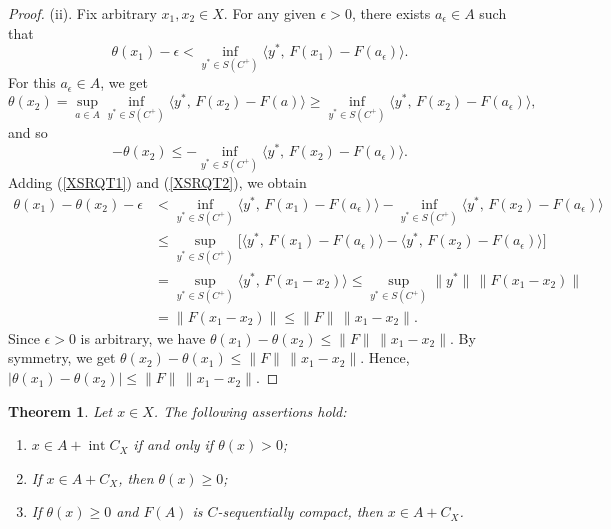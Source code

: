 \documentclass[11pt]{article}
\newtheorem{theorem}{Theorem}[section]
\begin{document}
\begin{proof}
	(ii). Fix arbitrary $x_1,x_2\in X$. For any given $\epsilon>0$, there exists $a_\epsilon\in A$ such that
	\begin{equation}   \label{XSRQT1}
		\theta(x_1)-\epsilon < \inf_{y^*\in S(C^+)}\langle y^*,\,F(x_1)-F(a_\epsilon)\rangle .  
	\end{equation}
	For this $a_\epsilon\in A$, we get 
$$
		\theta(x_2)=\sup_{a\in A}\inf_{y^*\in S(C^+)}\langle y^*,\,F(x_2)-F(a)\rangle
		\ge \inf_{y^*\in S(C^+)}\langle y^*,\,F(x_2)-F(a_\epsilon)\rangle , 
$$
 and so
	\begin{equation}\label{XSRQT2}
		-\theta(x_2)\le -\inf_{y^*\in S(C^+)}\langle y^*,\,F(x_2)-F(a_\epsilon)\rangle .  
	\end{equation}
	Adding  (\ref{XSRQT1})  and  (\ref{XSRQT2}), we obtain
	\begin{align*}
		\theta(x_1)-\theta(x_2)-\epsilon 
		&< \inf_{y^*\in S(C^+)}\langle y^*,\,F(x_1)-F(a_\epsilon)\rangle
		-\inf_{y^*\in S(C^+)}\langle y^*,\,F(x_2)-F(a_\epsilon)\rangle \\
		&\le \sup_{y^*\in S(C^+)}\Big[
		\langle y^*,\,F(x_1)-F(a_\epsilon)\rangle
		-\langle y^*,\,F(x_2)-F(a_\epsilon)\rangle
		\Big] \\
		&= \sup_{y^*\in S(C^+)} \langle y^*,\,F(x_1-x_2)\rangle  
		\le \sup_{y^*\in S(C^+)} \|y^*\|\,\|F(x_1-x_2)\| \\
		&= \|F(x_1-x_2)\| \le \|F\|\,\|x_1-x_2\|.
	\end{align*}
	Since $\epsilon>0$ is arbitrary, we have
$	\theta(x_1)-\theta(x_2) \le \|F\|\,\|x_1-x_2\|. $
	By symmetry,  we get
$	\theta(x_2)-\theta(x_1) \le \|F\|\,\|x_1-x_2\|.$
	Hence,
	$	|\theta(x_1)-\theta(x_2)| \le \|F\|\,\|x_1-x_2\|.$
\end{proof}

\begin{theorem}  \label{TxEQ} 
	Let $x\in X$. The following assertions hold:
	\begin{enumerate}
		\item[(i)] $x\in A + \operatorname{int}C_X$ if and only if $\theta(x)>0$;
		\item[(ii)] If $x\in A + C_X$, then $\theta(x)\ge 0$;
		\item[(iii)] If $\theta(x)\ge 0$ and $F(A)$ is $C$-sequentially compact, then $x\in A + C_X$.
	\end{enumerate}
\end{theorem}
\end{document}
